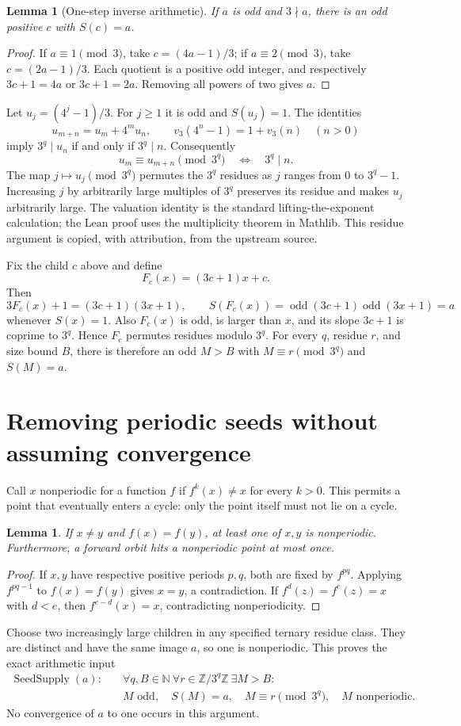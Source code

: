 \documentclass[11pt]{article}
\newtheorem{lemma}[theorem]{Lemma}
\newcommand{\N}{\mathbb N}
\begin{document}
\begin{lemma}[One-step inverse arithmetic]
If $a$ is odd and $3\nmid a$, there is an odd positive $c$ with $S(c)=a$.
\end{lemma}
\begin{proof}
If $a\equiv1\pmod3$, take $c=(4a-1)/3$; if $a\equiv2\pmod3$, take
$c=(2a-1)/3$. Each quotient is a positive odd integer, and respectively
$3c+1=4a$ or $3c+1=2a$. Removing all powers of two gives $a$.
\end{proof}

Let $u_j=(4^j-1)/3$. For $j\ge1$ it is odd and $S(u_j)=1$.
The identities
\[
 u_{m+n}=u_m+4^m u_n,\qquad
 v_3(4^n-1)=1+v_3(n)\quad(n>0)
\]
imply $3^q\mid u_n$ if and only if $3^q\mid n$. Consequently
\[
 u_m\equiv u_{m+n}\pmod{3^q}\quad\Longleftrightarrow\quad 3^q\mid n.
\]
The map $j\mapsto u_j\pmod{3^q}$ permutes the $3^q$ residues as $j$
ranges from $0$ to $3^q-1$. Increasing $j$ by arbitrarily large multiples
of $3^q$ preserves its residue and makes $u_j$ arbitrarily large.
The valuation identity is the standard lifting-the-exponent calculation;
the Lean proof uses the multiplicity theorem in Mathlib. This residue
argument is copied, with attribution, from the upstream source.

Fix the child $c$ above and define
\[
 F_c(x)=(3c+1)x+c.
\]
Then
\[
 3F_c(x)+1=(3c+1)(3x+1),\qquad
 S(F_c(x))=\operatorname{odd}(3c+1)\operatorname{odd}(3x+1)=a
\]
whenever $S(x)=1$. Also $F_c(x)$ is odd, is larger than $x$, and its slope
$3c+1$ is coprime to $3^q$. Hence $F_c$ permutes residues modulo $3^q$.
For every $q$, residue $r$, and size bound $B$, there is therefore an odd
$M>B$ with $M\equiv r\pmod{3^q}$ and $S(M)=a$.

\section{Removing periodic seeds without assuming convergence}
Call $x$ nonperiodic for a function $f$ if $f^k(x)\ne x$ for every $k>0$.
This permits a point that eventually enters a cycle: only the point itself
must not lie on a cycle.
\begin{lemma}
If $x\ne y$ and $f(x)=f(y)$, at least one of $x,y$ is nonperiodic.
Furthermore, a forward orbit hits a nonperiodic point at most once.
\end{lemma}
\begin{proof}
If $x,y$ have respective positive periods $p,q$, both are fixed by $f^{pq}$.
Applying $f^{pq-1}$ to $f(x)=f(y)$ gives $x=y$, a contradiction.
If $f^d(z)=f^e(z)=x$ with $d<e$, then $f^{e-d}(x)=x$,
contradicting nonperiodicity.
\end{proof}
Choose two increasingly large children in any specified ternary residue
class. They are distinct and have the same image $a$, so one is
nonperiodic. This proves the exact arithmetic input
\[
 \begin{split}
 \operatorname{SeedSupply}(a):\quad
 &\forall q,B\in\N\ \forall r\in\mathbb Z/3^q\mathbb Z\ \exists M>B:\\
 &M\text{ odd},\quad S(M)=a,\quad M\equiv r\pmod{3^q},\quad
 M\text{ nonperiodic}.
 \end{split}
\]
No convergence of $a$ to one occurs in this argument.
\end{document}
